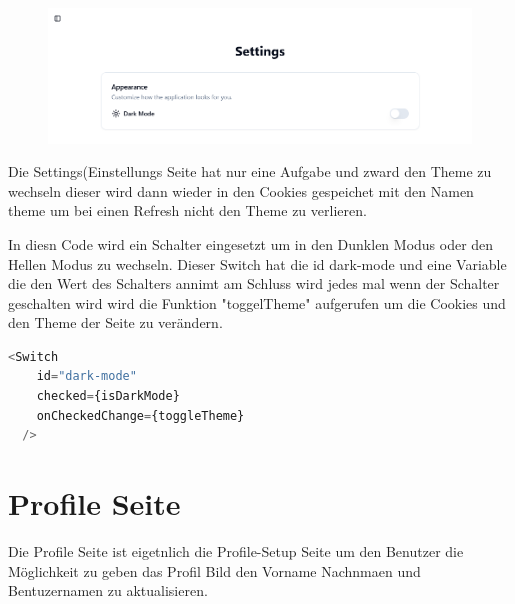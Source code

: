 \begin{inhalt}
\begin{enumerate}[label=\textbf{\arabic*.}]
\begin{figure}[!htb]
\centering
\includegraphics[width=1\textwidth]{files/Thomas/pics/Website/Settings/settings-screen.png}
\caption[Bildbezeichnung für Abbildungsverzeichnis]{}
\label{fig:gehaeuse_internet_bild}
\end{figure}


Die Settings(Einstellungs Seite hat nur eine Aufgabe und zward den Theme zu wechseln dieser wird dann wieder in den Cookies gespeichet mit den Namen theme um bei einen Refresh nicht den Theme zu verlieren.

\vspace{2cm}

In diesn Code wird ein Schalter eingesetzt um in den Dunklen Modus oder den Hellen Modus zu wechseln. Dieser Switch hat die id dark-mode und eine Variable die den Wert des Schalters annimt am Schluss wird jedes mal wenn der Schalter geschalten wird wird die Funktion "toggelTheme" aufgerufen um die Cookies und den Theme der Seite zu verändern.


\begin{lstlisting}[language=TypeScript]
<Switch
    id="dark-mode"
    checked={isDarkMode}
    onCheckedChange={toggleTheme}
  />
\end{lstlisting}

\newpage

\section{Profile Seite}

Die Profile Seite ist eigetnlich die Profile-Setup Seite um den Benutzer die Möglichkeit zu geben das Profil Bild den Vorname Nachnmaen und Bentuzernamen zu aktualisieren.



\end{enumerate}
\end{inhalt}
